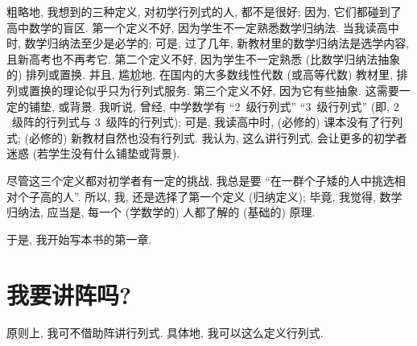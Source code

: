 \documentclass[%
    UTF8,%
    fontset=none,%
    punct=kaiming,%
    zihao=-4,%
    a4paper,%
    oneside,%
]{ctexbook}
\begin{document}
粗略地, 我想到的三种定义,
对初学行列式的人,
都不是很好;
因为, 它们都碰到了高中数学的盲区.
第一个定义不好, 因为学生不一定熟悉数学归纳法.
当我读高中时, 数学归纳法至少是必学的;
可是, 过了几年, 新教材里的数学归纳法是选学内容,
且新高考也不再考它.
第二个定义不好, 因为学生不一定熟悉
(比数学归纳法抽象的) 排列或置换.
并且, 尴尬地, 在国内的大多数线性代数 (或高等代数) 教材里,
排列或置换的理论似乎只为行列式服务.
第三个定义不好, 因为它有些抽象.
这需要一定的铺垫, 或背景.
我听说, 曾经, 中学数学有
``\(2\)~级行列式'' ``\(3\)~级行列式''
(即, \(2\)~级阵的行列式与 \(3\)~级阵的行列式);
可是, 我读高中时, (必修的) 课本没有了行列式;
(必修的) 新教材自然也没有行列式.
我认为, 这么讲行列式, 会让更多的初学者迷惑
(若学生没有什么铺垫或背景).

尽管这三个定义都对初学者有一定的挑战,
我总是要
``在一群个子矮的人中挑选相对个子高的人''.
所以, 我, 还是选择了第一个定义
(归纳定义);
毕竟, 我觉得, 数学归纳法, 应当是,
每一个 (学数学的) 人都了解的 (基础的) 原理.

于是, 我开始写本书的第一章.

\section{我要讲阵吗?}

原则上, 我可不借助阵讲行列式.
具体地, 我可以这么定义行列式.
\end{document}
